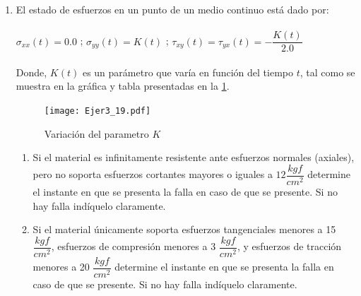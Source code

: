\documentclass[../notas medios.tex]{subfiles}
\begin{document}
\begin{enumerate}
\begin{enumerate}
	\item Calcular el vector de tracciones $\vec{t}$, que act\'ua en la cara del punto $P$, que es paralela al plano que contiene  los puntos $A$ , $B$ y $C$.
	\item Calcular el esfuerzo normal al que est\'a sometida la cara del punto $P$, que es paralela al plano que contiene los puntos $A$ , $B$ y $C$.
	\item Calcular la magnitud del esfuerzo tangencial al que est\'a sometida la cara del punto $P$, que es paralela al plano que contiene los puntos $A$ , $B$ y $C$.
	\item Encontrar la matriz de transformaci\'on del sistema de referencia $X-Y-Z$ al sistema de referencia $X'-Y'-Z'$ para el cual el eje $X'$ es paralelo al vector $\vec{V}_{AB}$ y el eje $Y'$ es normal al vector normal al plano que contiene los puntos A, B y C.\\
\end{enumerate}
%	
\item \label{punto19} El estado de esfuerzos en un punto de un medio continuo
est\'a dado por:\\\\
%
\hspace*{10mm} $ \sigma_{xx} (t)= 0.0$\hspace*{5mm} \hspace*{5mm}; $\sigma_{yy} (t) = K(t)$ \hspace*{5mm};\hspace*{5mm} $ \tau_{xy} (t) = \tau_{yx} (t) =-\dfrac{K(t)}{2.0}$ \\
\\	
%
Donde, $K(t)$ es un par\'ametro que var\'ia en funci\'on del tiempo $t$, tal como se muestra en la gr\'afica y tabla presentadas en la \cref{curva:carga}. \\
%
\begin{figure}[H]
\centering
\texttt{[image: Ejer3\_19.pdf]}
\caption{Variaci\'on del parametro $K$}
\label{curva:carga}
\end{figure}
%
\begin{enumerate}
	\item Si el material es infinitamente resistente ante esfuerzos normales (axiales), pero no soporta esfuerzos cortantes mayores o iguales a $12\dfrac{kgf}{cm^2}$ determine el instante en que se presenta la falla en caso de que se presente. Si no hay falla ind\'iquelo claramente.
%
	\item Si el material \'unicamente soporta esfuerzos tangenciales menores a 15 $\dfrac{kgf}{cm^2}$, esfuerzos de compresi\'on menores a 3 $\dfrac{kgf}{cm^2}$, y esfuerzos de tracci\'on menores a 20 $\dfrac{kgf}{cm^2}$ determine el instante en que se presenta la falla en caso de que se presente. Si no hay falla ind\'iquelo claramente. \\

\end{enumerate}
\end{enumerate}
\end{document}
